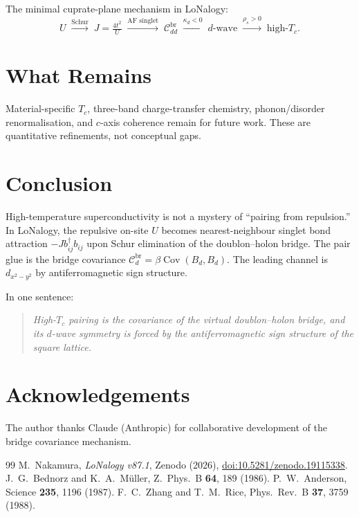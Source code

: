 \documentclass[12pt]{article}
\theoremstyle{plain}
\theoremstyle{definition}
\numberwithin{equation}{section}
\newcommand{\br}{\mathrm{br}}
\DeclareMathOperator{\Cov}{Cov}
\begin{document}
The minimal cuprate-plane mechanism in LoNalogy:
\begin{equation}
\boxed{U
\;\xrightarrow{\text{Schur}}\;
J\!=\!\tfrac{4t^2}{U}
\;\xrightarrow{\text{AF singlet}}\;
\mathcal{C}_{dd}^{\br}
\;\xrightarrow{\kappa_d<0}\;
d\text{-wave}
\;\xrightarrow{\rho_s>0}\;
\text{high-}T_c.}
\end{equation}

\section{What Remains}\label{sec:open}

Material-specific $T_c$, three-band charge-transfer chemistry,
phonon/disorder renormalisation, and $c$-axis coherence remain for
future work.  These are quantitative refinements, not conceptual
gaps.


\section*{Conclusion}

High-temperature superconductivity is not a mystery of ``pairing
from repulsion.''  In LoNalogy, the repulsive on-site $U$ becomes
nearest-neighbour singlet bond attraction $-Jb_{ij}^\dagger b_{ij}$
upon Schur elimination of the doublon--holon bridge.  The pair glue
is the bridge covariance $\mathcal{C}_d^{\br}=\beta\Cov(B_d,B_d)$.
The leading channel is $d_{x^2-y^2}$ by antiferromagnetic sign
structure.

In one sentence:
\begin{quote}
\emph{High-$T_c$ pairing is the covariance of the virtual
doublon--holon bridge, and its $d$-wave symmetry is forced by the
antiferromagnetic sign structure of the square lattice.}
\end{quote}


\section*{Acknowledgements}

The author thanks Claude (Anthropic) for collaborative development
of the bridge covariance mechanism.


\begin{thebibliography}{99}
 M.~Nakamura, \textit{LoNalogy v87.1},
Zenodo (2026),
\href{https://doi.org/10.5281/zenodo.19115338}{doi:10.5281/zenodo.19115338}.
 J.~G.~Bednorz and K.~A.~M\"uller,
Z.\ Phys.\ B \textbf{64}, 189 (1986).
 P.~W.~Anderson,
Science \textbf{235}, 1196 (1987).
 F.~C.~Zhang and T.~M.~Rice,
Phys.\ Rev.\ B \textbf{37}, 3759 (1988).
\end{thebibliography}
\end{document}
